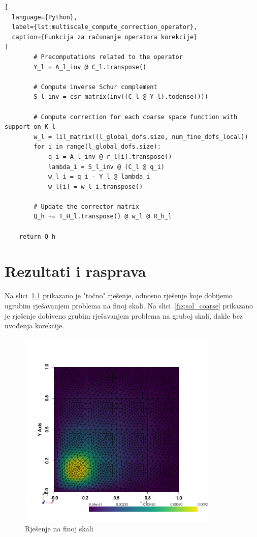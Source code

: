 \documentclass[zavrsnirad]{fer}
\begin{document}
\begin{lstlisting}[
  language={Python},
  label={lst:multiscale_compute_correction_operator},
  caption={Funkcija za računanje operatora korekcije}
]
        # Precomputations related to the operator
        Y_l = A_l_inv @ C_l.transpose()

        # Compute inverse Schur complement
        S_l_inv = csr_matrix(inv((C_l @ Y_l).todense()))

        # Compute correction for each coarse space function with support on K_l
        w_l = lil_matrix((l_global_dofs.size, num_fine_dofs_local))
        for i in range(l_global_dofs.size):
            q_i = A_l_inv @ r_l[i].transpose()
            lambda_i = S_l_inv @ (C_l @ q_i)
            w_l_i = q_i - Y_l @ lambda_i
            w_l[i] = w_l_i.transpose()

        # Update the corrector matrix
        Q_h += T_H_l.transpose() @ w_l @ R_h_l

    return Q_h
\end{lstlisting}

\renewcommand\thechapter{\arabic{chapter}.}

\chapter{Rezultati i rasprava}
\label{pog:rezultati_i_rasprava}

Na slici\ \ref{fig:sol_fine} prikazano je "točno" rješenje, odnosno rješenje koje dobijemo
ugrubim rješavanjem problema na finoj skali.
Na slici\ \ref{fig:sol_coarse} prikazano je rješenje dobiveno grubim rješavanjem problema na gruboj skali,
dakle bez uvođenja korekcije.

\begin{figure}[h]
  \centering
  \includegraphics[width=0.85\textwidth]{Figures/solution_fine.png}
  \caption{Rješenje na finoj skali}
  \label{fig:sol_fine}
\end{figure}
\end{document}
